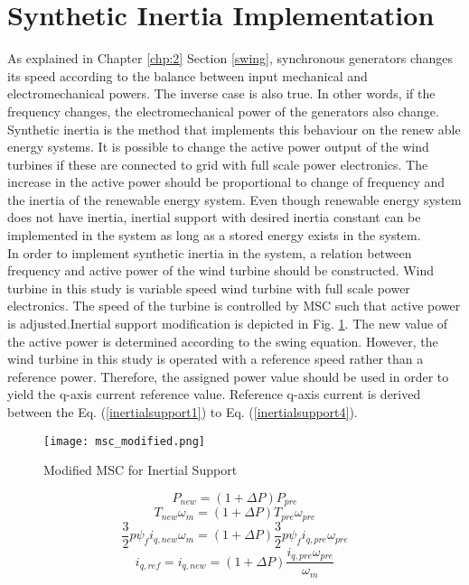 \section{Synthetic Inertia Implementation}
As explained in Chapter \ref{chp:2} Section \ref{swing}, synchronous generators changes its speed according to the balance between input mechanical and electromechanical powers. The inverse case is also true. In other words, if the frequency changes, the electromechanical power of the generators also change. Synthetic inertia is the method that implements this behaviour on the renew able energy systems. It is possible to change the active power output of the wind turbines if these are connected to grid with full scale power electronics. The increase in the active power should be proportional to change of frequency and the inertia of the renewable energy system. Even though renewable energy system does not have inertia, inertial support with desired inertia constant can be implemented in the system as long as a stored energy exists in the system.\\
In order to implement synthetic inertia in the system, a relation between frequency and active power of the wind turbine should be constructed. Wind turbine in this study is variable speed wind turbine with full scale power electronics. The speed of the turbine is controlled by MSC such that active power is adjusted.Inertial support modification is depicted in Fig. \ref{modifiedmsc}. The new value of the active power is determined according to the swing equation. However, the wind turbine in this study is operated with a reference speed rather than a reference power. Therefore, the assigned power value should be used in order to yield the q-axis current reference value. Reference q-axis current is derived between the Eq. (\ref{inertialsupport1}) to Eq. (\ref{inertialsupport4}).
\begin{figure}[h!]
	\centering
	\texttt{[image: msc\_modified.png]}
	\caption{Modified MSC for Inertial Support}
	\label{modifiedmsc}
\end{figure}
\begin{equation}
P_{new}=(1+\Delta P) P_{pre}
\label{inertialsupport1}
\end{equation}
\begin{equation}
T_{new} \omega_{m}=(1+\Delta P) T_{pre} \omega_{pre}
\label{inertialsupport2}
\end{equation}
\begin{equation}
\frac{3}{2} p \psi_{f} i_{q,new} \omega_{m}=(1+\Delta P) \frac{3}{2} p \psi_{f} i_{q,pre} \omega_{pre}
\label{inertialsupport3}
\end{equation}
\begin{equation}
 i_{q,ref}=i_{q,new}=(1+\Delta P) \frac{i_{q,pre} \omega_{pre}}{ \omega_{m}} 
\label{inertialsupport4}
\end{equation}

